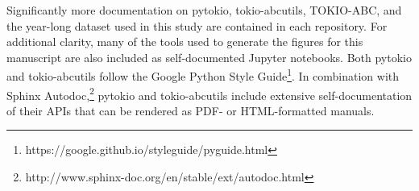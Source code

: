 Significantly more documentation on pytokio, tokio-abcutils, TOKIO-ABC, and the year-long dataset used in this study are contained in each repository.
For additional clarity, many of the tools used to generate the figures for this manuscript are also included as self-documented Jupyter notebooks.
Both pytokio and tokio-abcutils follow the Google Python Style Guide\footnote{https://google.github.io/styleguide/pyguide.html}.
In combination with Sphinx Autodoc,\footnote{http://www.sphinx-doc.org/en/stable/ext/autodoc.html} pytokio and tokio-abcutils include extensive self-documentation of their APIs that can be rendered as PDF- or HTML-formatted manuals.